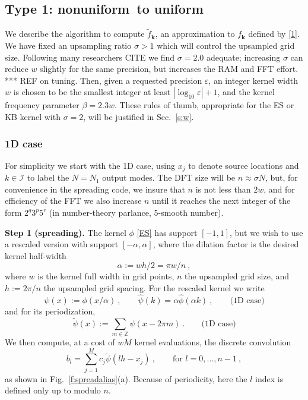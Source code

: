 \documentclass[10pt]{article}
\newcommand{\be}{\begin{equation}}
\newcommand{\ee}{\end{equation}}
\newcommand{\mbf}[1]{{\mathbf #1}}
\newcommand{\ZZ}{\mathbb{Z}}
\newcommand{\eps}{\varepsilon}
\newcommand{\bigO}{{\mathcal O}}
\newcommand{\kk}{\mbf{k}}
\newcommand{\KK}{{\mathcal I}}     %
\newcommand{\freq}{\beta}          %
\newcommand{\rat}{\sigma}          %
\newcommand{\ppsi}{{\tilde\psi}}   %
\newcommand{\al}{\alpha}           %
\newcommand{\NU}{{nonuniform}}       %
\newcommand{\U}{{uniform}}
\begin{document}
\subsection{Type 1: \NU\ to \U}
\label{s:type1}

We describe the algorithm to compute $\tilde f_\kk$, an approximation
to $f_\kk$ defined by \eqref{1}.
We have fixed an upsampling ratio $\rat>1$ which will control the
upsampled grid size.
Following many researchers CITE we find $\rat=2.0$ adequate;
increasing $\rat$ can reduce $w$ slightly for the same precision,
but increases the RAM and FFT effort.
*** REF on tuning.
Then, given a requested precision $\eps$,
an integer kernel width $w$ is chosen
to be the smallest integer at least $|\log_{10} \eps| + 1$,
and the kernel frequency parameter $\freq = 2.3 w$.
These rules of thumb, appropriate for the ES or KB kernel with
$\rat=2$, will be justified in Sec.~\ref{s:w}.



\subsubsection{1D case}
\label{s:1d1}

For simplicity we start with the 1D case, using $x_j$ to denote source
locations and $k\in\KK$ to label the $N=N_1$ output modes.
The DFT size will be $n \approx \rat N$,
but, for convenience in the spreading code, we insure that $n$
is not less than $2w$,
and for efficiency of the FFT we also increase $n$ until it reaches the next
integer of the form $2^q3^p5^r$ (in number-theory parlance, 5-smooth number).

{\bf Step 1 (spreading).}
The kernel $\phi$ \eqref{ES} has support $[-1,1]$, but we wish to
use a rescaled version with support $[-\al,\al]$, where
the dilation factor is the desired kernel half-width
\be
\alpha := wh/2 = \pi w/n
~,
\label{al}
\ee
where $w$ is the kernel full width in grid points, $n$
the upsampled grid size, and $h := 2\pi/n$ the upsampled grid spacing.
For the rescaled kernel we write
\be
\psi(x) := \phi(x/\al)~,
\qquad \hat\psi(k) = \al \hat\phi(\al k)~,
\qquad \mbox{(1D case)}
\label{psi1}
\ee
and for its periodization,
\be
\ppsi(x) := \sum_{m\in\ZZ} \psi(x-2\pi m)
~.
\qquad \mbox{(1D case)}
\label{ppsi1}
\ee
We then compute, at a cost of $wM$ kernel evaluations, %
the discrete convolution
\be
b_l = \sum_{j=1}^M c_j \ppsi(lh - x_j)
~, \qquad \mbox{for } l=0,\dots,n-1
~,
\label{bl1}
\ee
as shown in Fig.~\ref{f:spreadalias}(a).
Because of periodicity, here the $l$ index is defined only up to modulo $n$.
\end{document}
